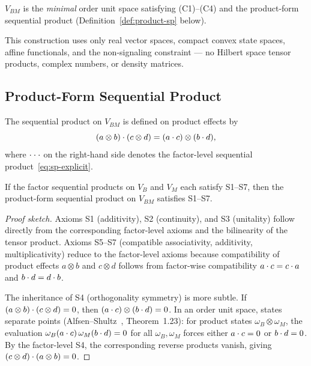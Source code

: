 \begin{assumption}\label{ass:minimal-composite}
$V_{BM}$ is the \emph{minimal} order unit space satisfying
(C1)--(C4) and the product-form sequential product
(Definition~\ref{def:product-sp} below).
\end{assumption}

This construction uses only real vector spaces, compact convex state
spaces, affine functionals, and the non-signaling constraint --- no
Hilbert space tensor products, complex numbers, or density matrices.

\subsection{Product-Form Sequential Product}\label{subsec:product-sp}

\begin{definition}\label{def:product-sp}
The sequential product on $V_{BM}$ is defined on product effects by
\begin{equation}\label{eq:product-sp}
  \sp{(a \otimes b)}{(c \otimes d)}
  = (\sp{a}{c}) \otimes (\sp{b}{d}),
\end{equation}
where $\sp{\cdot}{\cdot}$ on the right-hand side denotes the
factor-level sequential product~\eqref{eq:sp-explicit}.
\end{definition}

\begin{proposition}[S1--S7 inheritance]\label{prop:inheritance}
If the factor sequential products on $V_B$ and $V_M$ each satisfy
S1--S7, then the product-form sequential product on $V_{BM}$ satisfies
S1--S7.
\end{proposition}

\begin{proof}[Proof sketch]
Axioms S1 (additivity), S2 (continuity), and S3 (unitality) follow
directly from the corresponding factor-level axioms and the bilinearity
of the tensor product. Axioms S5--S7 (compatible associativity,
additivity, multiplicativity) reduce to the factor-level axioms because
compatibility of product effects
$a\otimes b$ and $c\otimes d$ follows from factor-wise compatibility
$\sp{a}{c}=\sp{c}{a}$ and $\sp{b}{d}=\sp{d}{b}$.

The inheritance of S4 (orthogonality symmetry) is more subtle. If
$\sp{(a\otimes b)}{(c\otimes d)} = 0$, then
$(\sp{a}{c})\otimes(\sp{b}{d}) = 0$. In an order unit space, states
separate points (Alfsen--Shultz~\cite{AlfsenShultz2003}, Theorem~1.23):
for product states $\omega_B\otimes\omega_M$, the evaluation
$\omega_B(\sp{a}{c})\,\omega_M(\sp{b}{d}) = 0$ for all
$\omega_B,\omega_M$ forces either $\sp{a}{c} = 0$ or $\sp{b}{d} = 0$.
By the factor-level S4, the corresponding reverse products vanish, giving
$\sp{(c\otimes d)}{(a\otimes b)} = 0$.
\end{proof}

